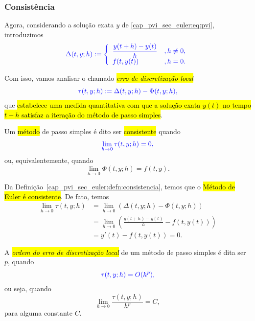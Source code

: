 \subsubsection{Consistência}

Agora, considerando a solução exata $y$ de \eqref{cap_pvi_sec_euler:eq:pvi}, introduzimos
\begin{equation}\color{blue}\Delta(t, y; h) := \left\{
    \begin{array}{ll}
      \displaystyle\frac{y(t+h)-y(t)}{h} &, h\neq 0,\\
      f(t, y(t)) &, h=0.
    \end{array}\right.
\end{equation}

Com isso, vamos analisar o chamado \hl{\emph{erro de discretização local}}
\begin{equation}\color{blue}\tau(t, y; h) := \Delta(t, y; h) - \Phi(t, y; h),
\end{equation}
que \hl{estabelece uma medida quantitativa com que a solução exata $y(t)$ no tempo $t+h$ satisfaz a iteração do método de passo simples}.

\begin{defn}\label{cap_pvi_sec_euler:defn:consistencia}
  Um \hl{método} de passo simples é dito ser \hl{consistente} quando
  \begin{equation}\color{blue}\lim_{h\to 0}\tau(t,y;h) = 0,
  \end{equation}
  ou, equivalentemente, quando
  \begin{equation}
    \lim_{h\to 0} \Phi(t, y; h) = f(t, y).
  \end{equation}
\end{defn}

\begin{obs}
  Da Definição~\ref{cap_pvi_sec_euler:defn:consistencia}, temos que o \hl{Método de Euler é consistente}. De fato, temos
  \begin{align}
    \lim_{h\to 0} \tau(t, y; h) &= \lim_{h\to 0} \left(\Delta(t, y; h) - \Phi(t, y; h)\right)\\
                                &= \lim_{h\to 0} \left(\frac{y(t+h)-y(t)}{h} - f\left(t,y(t)\right)\right)\\
                                &= y'(t) - f\left(t, y(t)\right) = 0.
  \end{align}
\end{obs}

A \hl{\emph{ordem do erro de discretização local}} de um método de passo simples é dita ser $p$, quando
\begin{equation}\color{blue}\tau(t, y; h) = O(h^p),
\end{equation}
ou seja, quando
\begin{equation}
  \lim_{h\to 0} \frac{\tau(t, y; h)}{h^p} = C,
\end{equation}
para alguma constante $C$.

